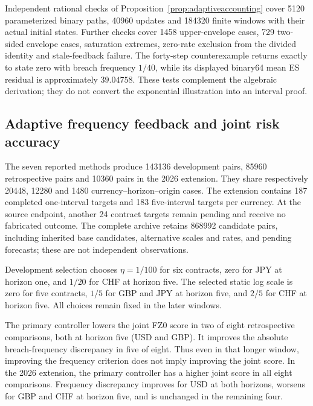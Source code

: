 \documentclass[11pt,a4paper]{article}
\theoremstyle{definition}\newtheorem{definition}[theorem]{Definition}
\begin{document}
Independent rational checks of Proposition~\ref{prop:adaptiveaccounting} cover 5120 parameterized binary paths, 40960 updates and 184320 finite windows with their actual initial states. Further checks cover 1458 upper-envelope cases, 729 two-sided envelope cases, saturation extremes, zero-rate exclusion from the divided identity and stale-feedback failure. The forty-step counterexample returns exactly to state zero with breach frequency $1/40$, while its displayed binary64 mean ES residual is approximately $39.04758$. These tests complement the algebraic derivation; they do not convert the exponential illustration into an interval proof.

\subsection{Adaptive frequency feedback and joint risk accuracy}\label{sec:adaptiveresults}
The seven reported methods produce 143136 development pairs, 85960 retrospective pairs and 10360 pairs in the 2026 extension. They share respectively 20448, 12280 and 1480 currency--horizon--origin cases. The extension contains 187 completed one-interval targets and 183 five-interval targets per currency. At the source endpoint, another 24 contract targets remain pending and receive no fabricated outcome. The complete archive retains 868992 candidate pairs, including inherited base candidates, alternative scales and rates, and pending forecasts; these are not independent observations.

Development selection chooses $\eta=1/100$ for six contracts, zero for JPY at horizon one, and $1/20$ for CHF at horizon five. The selected static log scale is zero for five contracts, $1/5$ for GBP and JPY at horizon five, and $2/5$ for CHF at horizon five. All choices remain fixed in the later windows.

\begin{table}[!htbp]\centering\small
\caption{Mean joint risk-score differences from the unchanged fast FHS base. Negative differences favor the alternative. Static is the development-selected constant scale; primary uses rate $1/20$ in horizon lanes; selected chooses its rate only on 2010--2019. The later 2026 window is short and descriptive.}\label{tab:adaptivescore}

\end{table}

The primary controller lowers the joint FZ0 score in two of eight retrospective comparisons, both at horizon five (USD and GBP). It improves the absolute breach-frequency discrepancy in five of eight. Thus even in that longer window, improving the frequency criterion does not imply improving the joint score. In the 2026 extension, the primary controller has a higher joint score in all eight comparisons. Frequency discrepancy improves for USD at both horizons, worsens for GBP and CHF at horizon five, and is unchanged in the remaining four.
\end{document}
